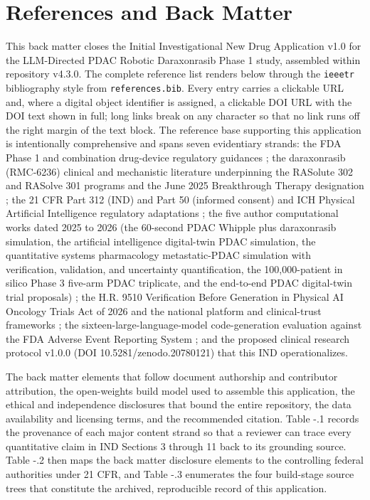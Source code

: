 \section*{References and Back Matter}

This back matter closes the Initial Investigational New Drug Application v1.0 for
the LLM-Directed PDAC Robotic Daraxonrasib Phase 1 study, assembled within
repository v4.3.0. The complete reference list renders below through the
\texttt{ieeetr} bibliography style from \texttt{references.bib}. Every entry
carries a clickable URL and, where a digital object identifier is assigned, a
clickable DOI URL with the DOI text shown in full; long links break on any
character so that no link runs off the right margin of the text block. The
reference base supporting this application is intentionally comprehensive and
spans seven evidentiary strands: the FDA Phase 1 and combination drug-device
regulatory guidances \cite{phase1guidance}; the daraxonrasib (RMC-6236) clinical
and mechanistic literature underpinning the RASolute 302 and RASolve 301 programs
and the June 2025 Breakthrough Therapy designation \cite{daraxwhipple}; the
21 CFR Part 312 (IND) and Part 50 (informed consent) and ICH Physical Artificial
Intelligence regulatory adaptations \cite{cfr312paiuni,cfr050paiuni,ichpaistduni};
the five author computational works dated 2025 to 2026 (the 60-second PDAC Whipple
plus daraxonrasib simulation, the artificial intelligence digital-twin PDAC
simulation, the quantitative systems pharmacology metastatic-PDAC simulation with
verification, validation, and uncertainty quantification, the 100,000-patient in
silico Phase 3 five-arm PDAC triplicate, and the end-to-end PDAC digital-twin trial
proposals) \cite{chatgpt100kp,qspmetpancre,fdadigtwinpc,pdacdigtwinp}; the H.R. 9510
Verification Before Generation in Physical AI Oncology Trials Act of 2026 and the
national platform and clinical-trust frameworks \cite{congress9510,clintrustpai,natlpaiplatf};
the sixteen-large-language-model code-generation evaluation against the FDA Adverse
Event Reporting System \cite{llmcomp16fda}; and the proposed clinical research
protocol v1.0.0 (DOI 10.5281/zenodo.20780121) that this IND operationalizes.

The back matter elements that follow document authorship and contributor
attribution, the open-weights build model used to assemble this application, the
ethical and independence disclosures that bound the entire repository, the data
availability and licensing terms, and the recommended citation. Table -.1 records
the provenance of each major content strand so that a reviewer can trace every
quantitative claim in IND Sections 3 through 11 back to its grounding source.
Table -.2 then maps the back matter disclosure elements to the controlling federal
authorities under 21 CFR, and Table -.3 enumerates the four build-stage source
trees that constitute the archived, reproducible record of this application.

